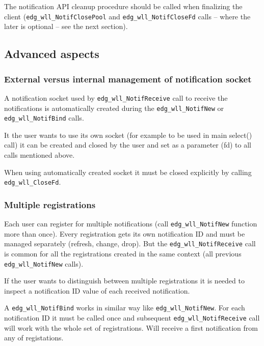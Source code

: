The notification API cleanup procedure should be called when
finalizing the client (\verb'edg_wll_NotifClosePool' and 
\verb'edg_wll_NotifCloseFd' calls -- where the later is optional 
-- see the next section).

\subsection{Advanced aspects}

\subsubsection{External versus internal management of notification socket}
A notification socket used by \verb'edg_wll_NotifReceive' call to
receive the notifications is automatically created during the
\verb'edg_wll_NotifNew' or \verb'edg_wll_NotifBind' calls.

It the user wants to use its own socket (for example to be used in
main select() call) it can be created and closed by the user and set
as a parameter (fd) to all calls mentioned above.

When using automatically created socket it must be closed explicitly
by calling \verb'edg_wll_CloseFd'.

\subsubsection{Multiple registrations}
Each user can register for multiple notifications (call
\verb'edg_wll_NotifNew' function more than once). Every registration
gets its own notification ID and must be managed separately (refresh,
change, drop). But the \verb'edg_wll_NotifReceive' call is common for
all the registrations created in the same context (all previous
\verb'edg_wll_NotifNew' calls). 

If the user wants to distinguish between multiple registrations it is
needed to inspect a notification ID value of each received notification.

A \verb'edg_wll_NotifBind' works in similar way like
\verb'edg_wll_NotifNew'. For each notification ID it must be called
once and subsequent \verb'edg_wll_NotifReceive' call will work with
the whole set of registrations. Will receive a first notification from
any of registations.


